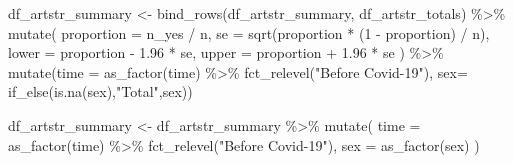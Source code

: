 \documentclass[
  letterpaper,
  DIV=11,
  numbers=noendperiod]{scrartcl}
\newenvironment{Shaded}{\begin{snugshade}}{\end{snugshade}}
\newcommand{\AttributeTok}[1]{\textcolor[rgb]{0.40,0.45,0.13}{#1}}
\newcommand{\DecValTok}[1]{\textcolor[rgb]{0.68,0.00,0.00}{#1}}
\newcommand{\FloatTok}[1]{\textcolor[rgb]{0.68,0.00,0.00}{#1}}
\newcommand{\FunctionTok}[1]{\textcolor[rgb]{0.28,0.35,0.67}{#1}}
\newcommand{\NormalTok}[1]{\textcolor[rgb]{0.00,0.23,0.31}{#1}}
\newcommand{\OtherTok}[1]{\textcolor[rgb]{0.00,0.23,0.31}{#1}}
\newcommand{\SpecialCharTok}[1]{\textcolor[rgb]{0.37,0.37,0.37}{#1}}
\newcommand{\StringTok}[1]{\textcolor[rgb]{0.13,0.47,0.30}{#1}}
\begin{document}
\begin{Shaded}
\begin{Highlighting}[]
\NormalTok{df\_artstr\_summary }\OtherTok{\textless{}{-}} \FunctionTok{bind\_rows}\NormalTok{(df\_artstr\_summary, df\_artstr\_totals) }\SpecialCharTok{\%\textgreater{}\%}
  \FunctionTok{mutate}\NormalTok{(}
    \AttributeTok{proportion =}\NormalTok{ n\_yes }\SpecialCharTok{/}\NormalTok{ n,}
    \AttributeTok{se =} \FunctionTok{sqrt}\NormalTok{(proportion }\SpecialCharTok{*}\NormalTok{ (}\DecValTok{1} \SpecialCharTok{{-}}\NormalTok{ proportion) }\SpecialCharTok{/}\NormalTok{ n),}
    \AttributeTok{lower =}\NormalTok{ proportion }\SpecialCharTok{{-}} \FloatTok{1.96} \SpecialCharTok{*}\NormalTok{ se,}
    \AttributeTok{upper =}\NormalTok{ proportion }\SpecialCharTok{+} \FloatTok{1.96} \SpecialCharTok{*}\NormalTok{ se}
\NormalTok{  ) }\SpecialCharTok{\%\textgreater{}\%} 
  \FunctionTok{mutate}\NormalTok{(}\AttributeTok{time =} \FunctionTok{as\_factor}\NormalTok{(time) }\SpecialCharTok{\%\textgreater{}\%} 
           \FunctionTok{fct\_relevel}\NormalTok{(}\StringTok{"Before Covid{-}19"}\NormalTok{),}
         \AttributeTok{sex=} \FunctionTok{if\_else}\NormalTok{(}\FunctionTok{is.na}\NormalTok{(sex),}\StringTok{"Total"}\NormalTok{,sex))}



\NormalTok{df\_artstr\_summary }\OtherTok{\textless{}{-}}\NormalTok{  df\_artstr\_summary }\SpecialCharTok{\%\textgreater{}\%} 
  \FunctionTok{mutate}\NormalTok{(}
    \AttributeTok{time =} \FunctionTok{as\_factor}\NormalTok{(time) }\SpecialCharTok{\%\textgreater{}\%} 
      \FunctionTok{fct\_relevel}\NormalTok{(}\StringTok{"Before Covid{-}19"}\NormalTok{),}
    \AttributeTok{sex =} \FunctionTok{as\_factor}\NormalTok{(sex)}
\NormalTok{  )}
\end{Highlighting}
\end{Shaded}
\end{document}
